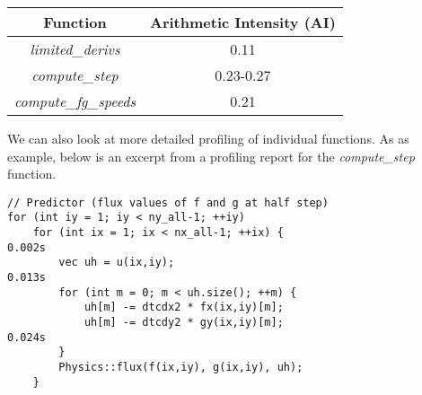 \begin{center}
\begin{tabular}{ |c|c| } 
 \hline
 Function & Arithmetic Intensity (AI) \\ 
 \hline
 \emph{limited\_derivs} & 0.11 \\ 
 \emph{compute\_step} & 0.23-0.27 \\ 
 \emph{compute\_fg\_speeds} & 0.21 \\ 
 \hline
\end{tabular}
\end{center}

We can also look at more detailed profiling of individual functions.
As as example, below is an excerpt from a profiling report for the 
\emph{compute\_step} function.

\begin{lstlisting}
// Predictor (flux values of f and g at half step)                                                             
for (int iy = 1; iy < ny_all-1; ++iy)                                                                          
    for (int ix = 1; ix < nx_all-1; ++ix) {                         0.002s
        vec uh = u(ix,iy);                                          0.013s 
        for (int m = 0; m < uh.size(); ++m) {                                                       
            uh[m] -= dtcdx2 * fx(ix,iy)[m];                                                         
            uh[m] -= dtcdy2 * gy(ix,iy)[m];                         0.024s
        }                                                                                           
        Physics::flux(f(ix,iy), g(ix,iy), uh);                                                      
    }                                                                                               
                                                                                                    

\end{lstlisting}
